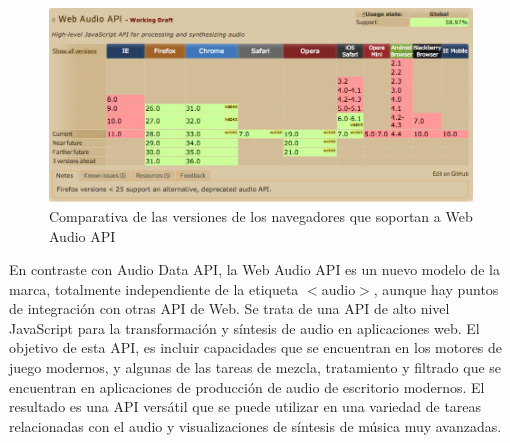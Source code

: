 \begin{figure}
 \centering
 \includegraphics[width=\textwidth]{../images/versiones_navegadores.png}
 \caption{Comparativa de las versiones de los navegadores que soportan a Web Audio API}
 \label{fig:../images/versiones_navegadores.png}
\end{figure}


En contraste con Audio Data API, la Web Audio API es un nuevo modelo de la marca, totalmente independiente de la etiqueta $<$audio$>$,  aunque hay puntos de integración con otras API de Web. Se trata de una API de alto nivel JavaScript para la transformación y síntesis de audio en aplicaciones web. El objetivo de esta API,  es incluir capacidades que se encuentran en los motores de juego modernos,  y algunas de las tareas de mezcla, tratamiento y filtrado que se encuentran en aplicaciones de producción de audio de escritorio modernos. El resultado es una API versátil que se puede utilizar en una variedad de tareas relacionadas con el audio y visualizaciones de síntesis de música muy avanzadas.